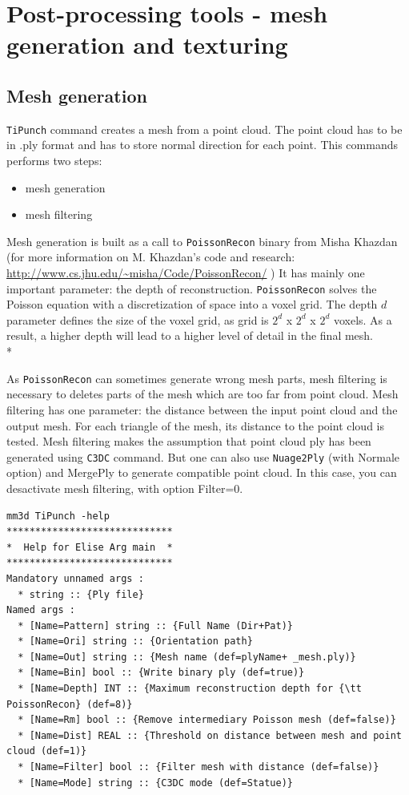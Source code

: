 
\section{Post-processing tools - mesh generation and texturing}

\subsection{Mesh generation}

{\tt TiPunch} command creates a mesh from a point cloud. The point cloud has to be in .ply format and has to store normal direction for each point.
This commands performs two steps:
\begin{itemize}
\item mesh generation
\item mesh filtering
\end{itemize}
Mesh generation is built as a call to {\tt PoissonRecon} binary from Misha Khazdan (for more information on M. Khazdan's code and research: \url{http://www.cs.jhu.edu/~misha/Code/PoissonRecon/} )
It has mainly one important parameter: the depth of reconstruction. {\tt PoissonRecon} solves the Poisson equation with a discretization of space into a voxel grid. The depth $d$ parameter defines the size of the voxel grid, as grid is $2^d$ x $2^d$ x $2^d$ voxels.
As a result, a higher depth will lead to a higher level of detail in the final mesh.\\*

As {\tt PoissonRecon} can sometimes generate wrong mesh parts, mesh filtering is necessary to deletes parts of the mesh which are too far from point cloud.
Mesh filtering has one parameter: the distance between the input point cloud and the output mesh. For each triangle of the mesh, its distance to the point cloud is tested.
Mesh filtering makes the assumption that point cloud ply has been generated using {\tt C3DC} command. But one can also use {\tt Nuage2Ply} (with Normale option) and MergePly to generate compatible point cloud. In this case, you can desactivate mesh filtering, with option Filter=0.

\begin{verbatim}
mm3d TiPunch -help
*****************************
*  Help for Elise Arg main  *
*****************************
Mandatory unnamed args :
  * string :: {Ply file}
Named args :
  * [Name=Pattern] string :: {Full Name (Dir+Pat)}
  * [Name=Ori] string :: {Orientation path}
  * [Name=Out] string :: {Mesh name (def=plyName+ _mesh.ply)}
  * [Name=Bin] bool :: {Write binary ply (def=true)}
  * [Name=Depth] INT :: {Maximum reconstruction depth for {\tt PoissonRecon} (def=8)}
  * [Name=Rm] bool :: {Remove intermediary Poisson mesh (def=false)}
  * [Name=Dist] REAL :: {Threshold on distance between mesh and point cloud (def=1)}
  * [Name=Filter] bool :: {Filter mesh with distance (def=false)}
  * [Name=Mode] string :: {C3DC mode (def=Statue)}
\end{verbatim}

